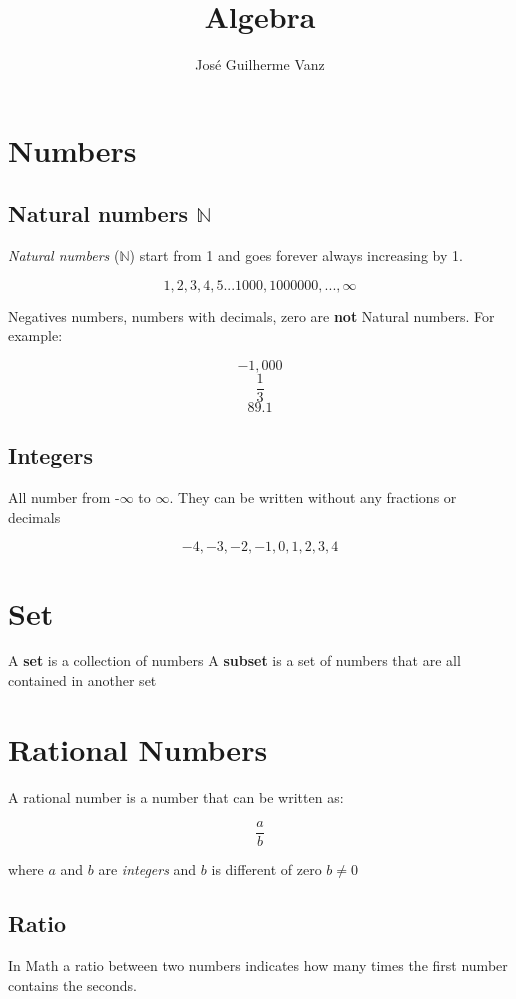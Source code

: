 \documentclass[]{article}
\title{Algebra}
\author{José Guilherme Vanz}
\begin{document}
\maketitle

\section{Numbers}

\subsection{Natural numbers $\mathbb{N}$}

\textit{Natural numbers} ($\mathbb{N}$) start from 1 and goes forever always increasing by 1.

\[ 1,2,3,4,5... 1000, 1000000, ..., \infty\]

Negatives numbers, numbers with decimals, zero are \textbf{not} Natural numbers. For example:

\[ -1,000 \]
\[\frac{1}{3}\]
\[ 89.1 \]


\subsection{Integers}

All number from -$ \infty $ to $ \infty $. They can be written without any fractions or decimals

\[-4, -3, -2, -1, 0, 1, 2, 3, 4\]

\section{Set}

A \textbf{set} is a collection of numbers
A \textbf{subset} is a set of numbers that are all contained in another set

\section{Rational Numbers}

A rational number is a number that can be written as:

\[ \frac{a}{b} \]

where $a$ and $b$ are \textit{integers} and $b$ is different of zero $ b \neq 0$

\subsection{Ratio}
In Math a ratio between two numbers indicates how many times the first number contains the seconds. 
\end{document}
